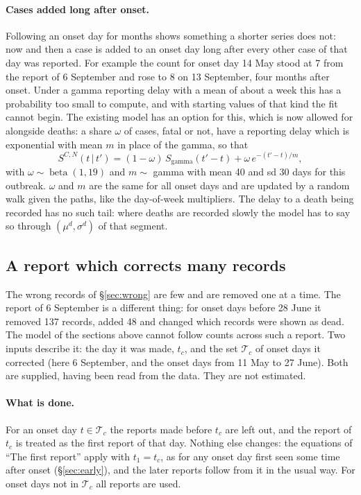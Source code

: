 \documentclass[11pt,a4paper]{article}
\newcommand{\given}{\,|\,}
\newcommand{\betad}{\operatorname{beta}}
\begin{document}
\paragraph{Cases added long after onset.} Following an onset day for months
shows something a shorter series does not: now and then a case is added to
an onset day long after every other case of that day was reported. For
example the count for onset day 14 May stood at 7 from the report of 6
September and rose to 8 on 13 September, four months after onset. Under a
gamma reporting delay with a mean of about a week this has a probability
too small to compute, and with starting values of that kind the fit cannot
begin. The existing model has an option for this, which is now allowed for
alongside deaths: a share $\omega$ of cases, fatal or not, have a reporting
delay which is exponential with mean $m$ in place of the gamma, so that
\[
S^{C,N}(t\given t')=(1-\omega)\,S_{\mathrm{gamma}}(t'-t)+\omega\,e^{-(t'-t)/m},
\]
with $\omega\sim\betad(1,19)$ and $m\sim$ gamma with mean 40 and sd 30 days
for this outbreak. $\omega$ and $m$ are the same for all onset days and are
updated by a random walk given the paths, like the day-of-week multipliers.
The delay to a death being recorded has no such tail: where deaths are
recorded slowly the model has to say so through $(\mu^{d},\sigma^{d})$ of
that segment.

\subsection{A report which corrects many records}\label{sec:correction}

The wrong records of \S\ref{sec:wrong} are few and are removed one at a
time. The report of 6 September is a different thing: for onset days before
28 June it removed 137 records, added 48 and changed which records were
shown as dead. The model of the sections above cannot follow counts across
such a report. Two inputs describe it: the day it was made, $t_c$, and the
set $\mathcal{T}_c$ of onset days it corrected (here 6 September, and the
onset days from 11 May to 27 June). Both are supplied, having been read
from the data. They are not estimated.

\paragraph{What is done.} For an onset day $t\in\mathcal{T}_c$ the reports
made before $t_c$ are left out, and the report of $t_c$ is treated as the
first report of that day. Nothing else changes: the equations of ``The
first report'' apply with $t_1=t_c$, as for any onset day first seen some
time after onset (\S\ref{sec:early}), and the later reports follow from it
in the usual way. For onset days not in $\mathcal{T}_c$ all reports are
used.
\end{document}
